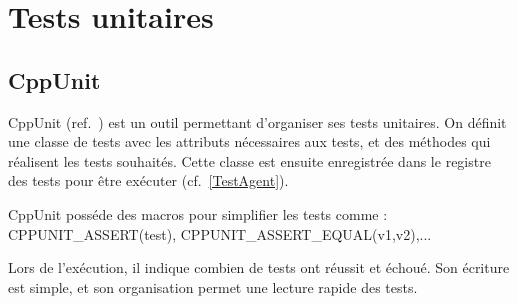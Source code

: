 \section{Tests unitaires}
\subsection{CppUnit}
CppUnit (ref.~\cite{CppUnit}) est un outil permettant d'organiser ses tests unitaires.
 On définit une classe de tests avec les attributs nécessaires aux tests, et des méthodes qui réalisent les tests souhaités. Cette classe est ensuite enregistrée dans le registre des tests pour être exécuter (cf.~\ref{TestAgent}).

CppUnit posséde des macros pour simplifier les tests comme :
CPPUNIT\_ASSERT(test), CPPUNIT\_ASSERT\_EQUAL(v1,v2),...

Lors de l'exécution, il indique combien de tests ont réussit et échoué.
Son écriture est simple, et son organisation permet une lecture rapide des tests.


